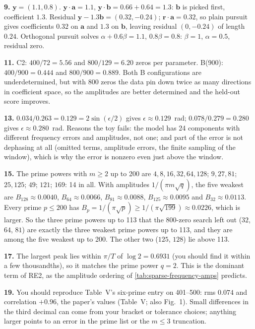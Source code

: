 \textbf{9.} $\bm y=(1.1,0.8)$. $\bm y\cdot\bm a=1.1$, $\bm y\cdot\bm b=0.66+0.64=1.3$: $\bm b$ is picked first, coefficient $1.3$. Residual $\bm y-1.3\bm b=(0.32,-0.24)$; $\bm r\cdot\bm a=0.32$, so plain pursuit gives coefficients $0.32$ on $\bm a$ and $1.3$ on $\bm b$, leaving residual $(0,-0.24)$ of length $0.24$. Orthogonal pursuit solves $\alpha+0.6\beta=1.1$, $0.8\beta=0.8$: $\beta=1$, $\alpha=0.5$, residual zero.

\textbf{11.} C2: $400/72=5.56$ and $800/129=6.20$ zeros per parameter. B(900): $400/900=0.444$ and $800/900=0.889$. Both B configurations are underdetermined, but with 800 zeros the data pin down twice as many directions in coefficient space, so the amplitudes are better determined and the held-out score improves.

\textbf{13.} $0.034/0.263=0.129=2\sin(\epsilon/2)$ gives $\epsilon\approx0.129$~rad; $0.078/0.279=0.280$ gives $\epsilon\approx0.280$~rad. Reasons the toy fails: the model has 24 components with different frequency errors and amplitudes, not one; and part of the error is not dephasing at all (omitted terms, amplitude errors, the finite sampling of the window), which is why the error is nonzero even just above the window.

\textbf{15.} The prime powers with $m\ge2$ up to 200 are $4,8,16,32,64,128$; $9,27,81$; $25,125$; $49$; $121$; $169$: 14 in all. With amplitudes $1/(\pi m\sqrt q)$, the five weakest are $B_{128}\approx0.0040$, $B_{64}\approx0.0066$, $B_{81}\approx0.0088$, $B_{125}\approx0.0095$ and $B_{32}\approx0.0113$. Every prime $p\le200$ has $B_p=1/(\pi\sqrt p)\ge1/(\pi\sqrt{199})\approx0.0226$, which is larger. So the three prime powers up to 113 that the 800-zero search left out ($32$, $64$, $81$) are exactly the three weakest prime powers up to 113, and they are among the five weakest up to 200. The other two ($125$, $128$) lie above 113.

\textbf{17.} The largest peak lies within $\pi/T$ of $\log2=0.6931$ (you should find it within a few thousandths), so it matches the prime power $q=2$. This is the dominant term of RE2, as the amplitude ordering of \cref{tab:sparse-frequency-amps} predicts.

\textbf{19.} You should reproduce Table~V's six-prime entry on 401--500: rms $0.074$ and correlation $+0.96$, the paper's values (Table~V; also Fig.~1). Small differences in the third decimal can come from your bracket or tolerance choices; anything larger points to an error in the prime list or the $m\le3$ truncation.

